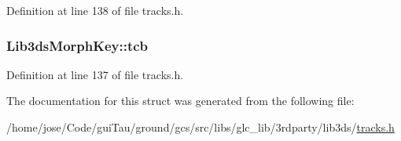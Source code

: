 Definition at line 138 of file tracks.\-h.

\hypertarget{struct_lib3ds_morph_key_a5fb13734626612f3a63cada207efccff}{
\subsubsection[{tcb}]{ Lib3ds\-Morph\-Key\-::tcb}}\label{struct_lib3ds_morph_key_a5fb13734626612f3a63cada207efccff}


Definition at line 137 of file tracks.\-h.



The documentation for this struct was generated from the following file\-:\begin{DoxyCompactItemize}
\item 
/home/jose/\-Code/gui\-Tau/ground/gcs/src/libs/glc\-\_\-lib/3rdparty/lib3ds/\hyperlink{tracks_8h}{tracks.\-h}\end{DoxyCompactItemize}

